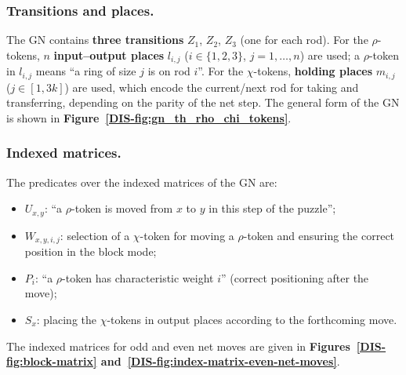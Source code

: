 	\subsubsection*{Transitions and places.}
	\vspace{-0.1cm}
	\hspace*{2.5em}The GN contains \textbf{three transitions} \(Z_1\), \(Z_2\), \(Z_3\) (one for each rod). For the \(\rho\)-tokens, \(n\) \textbf{input--output places} \(l_{i,j}\) (\(i\in\{1,2,3\}\), \(j=1,\dots,n\)) are used; a \(\rho\)-token in \(l_{i,j}\) means ``a ring of size \(j\) is on rod \(i\)''. For the \(\chi\)-tokens, \textbf{holding places} \(m_{i,j}\) (\(j\in[1,3k]\)) are used, which encode the current/next rod for taking and transferring, depending on the parity of the net step. The general form of the GN is shown in \textbf{Figure~\ref{DIS-fig:gn_th_rho_chi_tokens}}.
	
	\subsubsection*{Indexed matrices.}
	\vspace{-0.1cm}
	\hspace*{2.5em}The predicates over the indexed matrices of the GN are:
	\vspace{-0.2cm}
	\begin{itemize}
		\item \(U_{x,y}\): ``a \(\rho\)-token is moved from \(x\) to \(y\) in this step of the puzzle'';
		\item \(W_{x,y,i,j}\): selection of a \(\chi\)-token for moving a \(\rho\)-token and ensuring the correct position in the block mode;
		\item \(P_i\): ``a \(\rho\)-token has characteristic weight \(i\)'' (correct positioning after the move);
		\item \(S_x\): placing the \(\chi\)-tokens in output places according to the forthcoming move.
	\end{itemize}
	\hspace*{2.5em}The indexed matrices for odd and even net moves are given in \textbf{Figures~\ref{DIS-fig:block-matrix} and~\ref{DIS-fig:index-matrix-even-net-moves}}.
	

